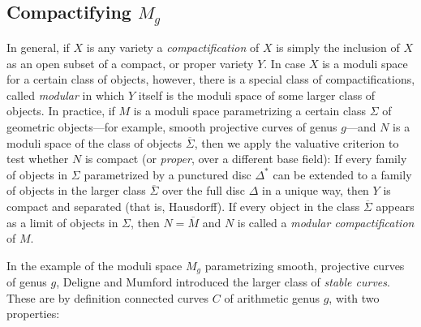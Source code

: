 %
%
%

\subsection{Compactifying $M_g$}\label{compactifying Mg}

In general, if $X$ is any variety a \emph{compactification} of $X$ is simply the inclusion of $X$ as an open subset of a compact, or proper variety $Y$. In case $X$ is a moduli space for a certain class of objects, however, there is a special class of compactifications,  called \emph{modular} in which $Y$ itself is the moduli space of some larger class of objects. In practice, if $M$ is a moduli space parametrizing a certain class $\Sigma$ of geometric objects---for example, smooth projective curves of genus $g$---and $N$ is a moduli space of the class of objects $\overline \Sigma$, then we apply the valuative criterion to test whether $N$ is compact (or \emph{proper}, over a different base field): If every family of objects in $\Sigma$ parametrized by a punctured disc $\Delta^*$ can be extended to a family of objects in the larger class $\overline \Sigma$ over the full disc $\Delta$ in a unique way, then $Y$ is compact and separated (that is, Hausdorff). If every object in the class $\overline \Sigma$ appears as a limit of objects in $\Sigma$, then $N = \overline M$ and $N$ is called a \emph{modular compactification} of $M$.

In the example of the moduli space $M_g$ parametrizing smooth, projective curves of genus $g$, Deligne and Mumford introduced the larger class of \emph{stable curves}. These are by definition connected curves $C$ of arithmetic genus $g$, with two properties:

